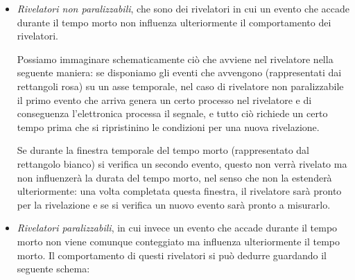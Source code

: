 \begin{itemize}[leftmargin=0.5cm]
   \item \textit{Rivelatori non paralizzabili}, che sono dei rivelatori in cui un evento che accade durante il tempo morto non influenza ulteriormente il comportamento dei rivelatori.
   
   Possiamo immaginare schematicamente ciò che avviene nel rivelatore nella seguente maniera: se disponiamo gli eventi che avvengono (rappresentati dai rettangoli rosa) su un asse temporale, nel caso di rivelatore non paralizzabile il primo evento che arriva genera un certo processo nel rivelatore e di conseguenza l'elettronica processa il segnale, e tutto ciò richiede un certo tempo prima che si ripristinino le condizioni per una nuova rivelazione.
   \begin{figure}[H]
      \centering
   \end{figure}
    Se durante la finestra temporale del tempo morto (rappresentato dal rettangolo bianco) si verifica un secondo evento, questo non verrà rivelato ma non influenzerà la durata del tempo morto, nel senso che non la estenderà ulteriormente: una volta completata questa finestra, il rivelatore sarà pronto per la rivelazione e se si verifica un nuovo evento sarà pronto a misurarlo.

   \item \textit{Rivelatori paralizzabili}, in cui invece un evento che accade durante il tempo morto non viene comunque conteggiato ma influenza ulteriormente il tempo morto. Il comportamento di questi rivelatori si può dedurre guardando il seguente schema:
   \begin{figure}[H]
      \centering
   \end{figure}
\end{itemize}

